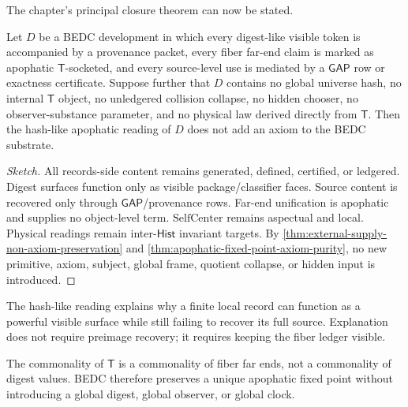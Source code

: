 The chapter's principal closure theorem can now be stated.

\begin{theorem}
\label{thm:hash-like-preserves-axiom-purity}
Let $D$ be a BEDC development in which every digest-like visible token is accompanied by a provenance packet, every fiber far-end claim is marked as apophatic $\mathsf{T}$-socketed, and every source-level use is mediated by a $\mathsf{GAP}$ row or exactness certificate. Suppose further that $D$ contains no global universe hash, no internal $\mathsf{T}$ object, no unledgered collision collapse, no hidden chooser, no observer-substance parameter, and no physical law derived directly from $\mathsf{T}$. Then the hash-like apophatic reading of $D$ does not add an axiom to the BEDC substrate.
\end{theorem}

\begin{proof}[Sketch]
All records-side content remains generated, defined, certified, or ledgered. Digest surfaces function only as visible package/classifier faces. Source content is recovered only through $\mathsf{GAP}$/provenance rows. Far-end unification is apophatic and supplies no object-level term. $\mathrm{SelfCenter}$ remains aspectual and local. Physical readings remain inter-$\mathsf{Hist}$ invariant targets. By \autoref{thm:external-supply-non-axiom-preservation} and \autoref{thm:apophatic-fixed-point-axiom-purity}, no new primitive, axiom, subject, global frame, quotient collapse, or hidden input is introduced.
\end{proof}

\begin{corollary}
\label{cor:hash-like-explanation-without-recovery}
The hash-like reading explains why a finite local record can function as a powerful visible surface while still failing to recover its full source. Explanation does not require preimage recovery; it requires keeping the fiber ledger visible.
\end{corollary}

\begin{corollary}
\label{cor:hash-like-universal-far-end}
The commonality of $\mathsf{T}$ is a commonality of fiber far ends, not a commonality of digest values. BEDC therefore preserves a unique apophatic fixed point without introducing a global digest, global observer, or global clock.
\end{corollary}

